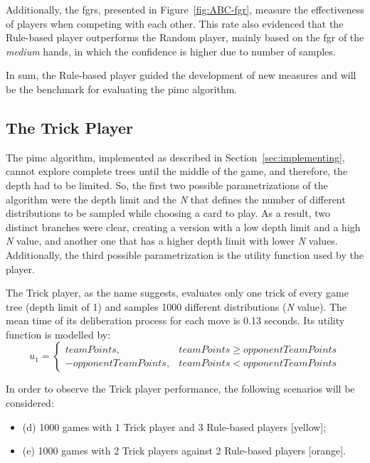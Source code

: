 Additionally, the \acp{fgr}, presented in Figure~\ref{fig:ABC-fgr}, measure the effectiveness of players when competing with each other.
This rate also evidenced that the Rule-based player outperforms the Random player, mainly based on the \ac{fgr} of the \emph{medium} hands, in which the confidence is higher due to number of samples.

In sum, the Rule-based player guided the development of new measures and will be the benchmark for evaluating the \ac{pimc} algorithm.


\subsection{The Trick Player}

The \ac{pimc} algorithm, implemented as described in Section~\ref{sec:implementing}, cannot explore complete trees until the middle of the game, and therefore, the depth had to be limited.
So, the first two possible parametrizations of the algorithm were the depth limit and the \emph{N} that defines the number of different distributions to be sampled while choosing a card to play.
As a result, two distinct branches were clear, creating a version with a low depth limit and a high \emph{N} value, and another one that has a higher depth limit with lower \emph{N} values.
Additionally, the third possible parametrization is the utility function used by the player.

The Trick player, as the name suggests, evaluates only one trick of every game tree (depth limit of 1) and samples 1000 different distributions (\emph{N} value).
The mean time of its deliberation process for each move is 0.13 seconds.
Its utility function is modelled by:
\begin{equation} \label{eq:uf1}
u_1 = \left\{
                \begin{array}{ll}
                  teamPoints, & teamPoints \geq opponentTeamPoints\\
                  - opponentTeamPoints, & teamPoints < opponentTeamPoints
                \end{array}
              \right.
\end{equation}

In order to observe the Trick player performance, the following scenarios will be considered:
\begin{itemize}
\item (d) 1000 games with 1 Trick player and 3 Rule-based players [yellow];
\item (e) 1000 games with 2 Trick players against 2 Rule-based players [orange].
\end{itemize}


